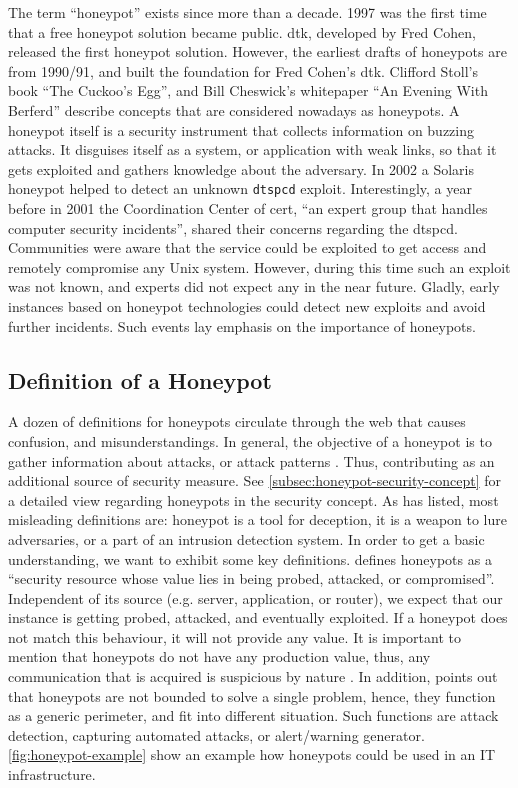 The term \enquote{honeypot} exists since more than a decade.
1997 was the first time that a free honeypot solution became public.
\ac{dtk}, developed by Fred Cohen, released the first honeypot solution.
However, the earliest drafts of honeypots are from 1990/91, and built the foundation for Fred Cohen's \ac*{dtk}.
Clifford Stoll's book \enquote{The Cuckoo's Egg}\cite{stroll2000}, and Bill Cheswick's whitepaper \enquote{An Evening With Berferd}\cite{Cheswick92} describe concepts that are considered nowadays as honeypots.\cite{Spitzner2003}
A honeypot itself is a security instrument that collects information on buzzing attacks.
It disguises itself as a system, or application with weak links, so that it gets exploited and gathers knowledge about the adversary.
In 2002 a Solaris honeypot helped to detect an unknown \verb|dtspcd| exploit.
Interestingly, a year before in 2001 the Coordination Center of \ac{cert}, \enquote{an expert group that handles computer security incidents}\cite{cert2021}, shared their concerns regarding the dtspcd.
Communities were aware that the service could be exploited to get access and remotely compromise any Unix system.
However, during this time such an exploit was not known, and experts did not expect any in the near future.
Gladly, early instances based on honeypot technologies could detect new exploits and avoid further incidents.
Such events lay emphasis on the importance of honeypots.

\subsection{Definition of a Honeypot}

A dozen of definitions for honeypots circulate through the web that causes confusion, and misunderstandings.
In general, the objective of a honeypot is to gather information about attacks, or attack patterns \cite{NawrockiWSKS2016}.
Thus, contributing as an additional source of security measure.
See \autoref{subsec:honeypot-security-concept} for a detailed view regarding honeypots in the security concept.
As \citet{Spitzner2003} has listed, most misleading definitions are: honeypot is a tool for deception, it is a weapon to lure adversaries, or a part of an intrusion detection system.
In order to get a basic understanding, we want to exhibit some key definitions.
\citet{Spitzner2003} defines honeypots as a \enquote{security resource whose value lies in being probed, attacked, or compromised}.
Independent of its source (e.g. server, application, or router), we expect that our instance is getting probed, attacked, and eventually exploited.
If a honeypot does not match this behaviour, it will not provide any value.
It is important to mention that honeypots do not have any production value, thus, any communication that is acquired is suspicious by nature \cite{Spitzner2003}.
In addition, \citet{Spitzner2003} points out that honeypots are not bounded to solve a single problem, hence, they function as a generic perimeter, and fit into different situation.
Such functions are attack detection, capturing automated attacks, or alert/warning generator.
\autoref{fig:honeypot-example} show an example how honeypots could be used in an IT infrastructure.

